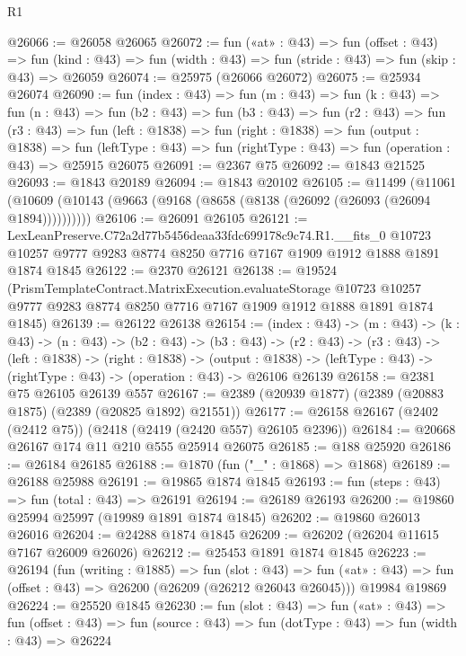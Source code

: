 \begin{lexlean}{R1}
\begin{coremodule}
@26066 := @26058 @26065
@26072 := fun («at» : @43) =>
  fun (offset : @43) =>
  fun (kind : @43) => fun (width : @43) => fun (stride : @43) => fun (skip : @43) => @26059
@26074 := @25975 (@26066 @26072)
@26075 := @25934 @26074
@26090 := fun (index : @43) =>
  fun (m : @43) =>
  fun (k : @43) =>
  fun (n : @43) =>
  fun (b2 : @43) =>
  fun (b3 : @43) =>
  fun (r2 : @43) =>
  fun (r3 : @43) =>
  fun (left : @1838) =>
  fun (right : @1838) =>
  fun (output : @1838) =>
  fun (leftType : @43) => fun (rightType : @43) => fun (operation : @43) => @25915 @26075
@26091 := @2367 @75
@26092 := @1843 @21525
@26093 := @1843 @20189
@26094 := @1843 @20102
@26105 := @11499
    (@11061 (@10609 (@10143 (@9663 (@9168 (@8658 (@8138 (@26092 (@26093 (@26094 @1894))))))))))
@26106 := @26091 @26105
@26121 := LexLeanPreserve.C72a2d77b5456deaa33fdc699178c9c74.R1.__fits_0
    @10723
    @10257
    @9777
    @9283
    @8774
    @8250
    @7716
    @7167
    @1909
    @1912
    @1888
    @1891
    @1874
    @1845
@26122 := @2370 @26121
@26138 := @19524
    (PrismTemplateContract.MatrixExecution.evaluateStorage
      @10723
      @10257
      @9777
      @9283
      @8774
      @8250
      @7716
      @7167
      @1909
      @1912
      @1888
      @1891
      @1874
      @1845)
@26139 := @26122 @26138
@26154 := (index : @43) ->
  (m : @43) ->
  (k : @43) ->
  (n : @43) ->
  (b2 : @43) ->
  (b3 : @43) ->
  (r2 : @43) ->
  (r3 : @43) ->
  (left : @1838) ->
  (right : @1838) ->
  (output : @1838) -> (leftType : @43) -> (rightType : @43) -> (operation : @43) -> @26106 @26139
@26158 := @2381 @75 @26105 @26139 @557
@26167 := @2389 (@20939 @1877) (@2389 (@20883 @1875) (@2389 (@20825 @1892) @21551))
@26177 := @26158 @26167 (@2402 (@2412 @75)) (@2418 (@2419 (@2420 @557) @26105 @2396))
@26184 := @20668 @26167 @174 @11 @210 @555 @25914 @26075
@26185 := @188 @25920
@26186 := @26184 @26185
@26188 := @1870 (fun ("_" : @1868) => @1868)
@26189 := @26188 @25988
@26191 := @19865 @1874 @1845
@26193 := fun (steps : @43) => fun (total : @43) => @26191
@26194 := @26189 @26193
@26200 := @19860 @25994 @25997 (@19989 @1891 @1874 @1845)
@26202 := @19860 @26013 @26016
@26204 := @24288 @1874 @1845
@26209 := @26202 (@26204 @11615 @7167 @26009 @26026)
@26212 := @25453 @1891 @1874 @1845
@26223 := @26194
    (fun (writing : @1885) =>
    fun (slot : @43) =>
    fun («at» : @43) => fun (offset : @43) => @26200 (@26209 (@26212 @26043 @26045)))
    @19984
    @19869
@26224 := @25520 @1845
@26230 := fun (slot : @43) =>
  fun («at» : @43) =>
  fun (offset : @43) => fun (source : @43) => fun (dotType : @43) => fun (width : @43) => @26224

\end{coremodule}
\end{lexlean}
